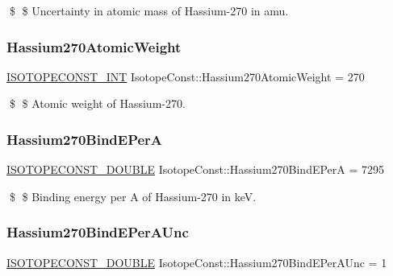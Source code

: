 \$ \$ Uncertainty in atomic mass of Hassium-\/270 in amu. \mbox{\label{group___isotope_const-_hassium-_hs270_ga130c504677cebed985b5454b25a57e8b}} 
\subsubsection{\texorpdfstring{Hassium270\+Atomic\+Weight}{Hassium270AtomicWeight}}
{\footnotesize\ttfamily \mbox{\hyperlink{group___isotope_const-_macros_ga5f18360b3e99483a35c32d789e62621c}{I\+S\+O\+T\+O\+P\+E\+C\+O\+N\+S\+T\+\_\+\+I\+NT}} Isotope\+Const\+::\+Hassium270\+Atomic\+Weight = 270}

\$ \$ Atomic weight of Hassium-\/270. \mbox{\label{group___isotope_const-_hassium-_hs270_gafdb6c0d672281a786fe5b87c5fd9fd6c}} 
\subsubsection{\texorpdfstring{Hassium270\+Bind\+E\+PerA}{Hassium270BindEPerA}}
{\footnotesize\ttfamily \mbox{\hyperlink{group___isotope_const-_macros_ga8f45a7272ce02c0b4c65c44636ed719a}{I\+S\+O\+T\+O\+P\+E\+C\+O\+N\+S\+T\+\_\+\+D\+O\+U\+B\+LE}} Isotope\+Const\+::\+Hassium270\+Bind\+E\+PerA = 7295}

\$ \$ Binding energy per A of Hassium-\/270 in keV. \mbox{\label{group___isotope_const-_hassium-_hs270_ga11204e2a9bd6c60ccccf78bfaf384ca6}} 
\subsubsection{\texorpdfstring{Hassium270\+Bind\+E\+Per\+A\+Unc}{Hassium270BindEPerAUnc}}
{\footnotesize\ttfamily \mbox{\hyperlink{group___isotope_const-_macros_ga8f45a7272ce02c0b4c65c44636ed719a}{I\+S\+O\+T\+O\+P\+E\+C\+O\+N\+S\+T\+\_\+\+D\+O\+U\+B\+LE}} Isotope\+Const\+::\+Hassium270\+Bind\+E\+Per\+A\+Unc = 1}

